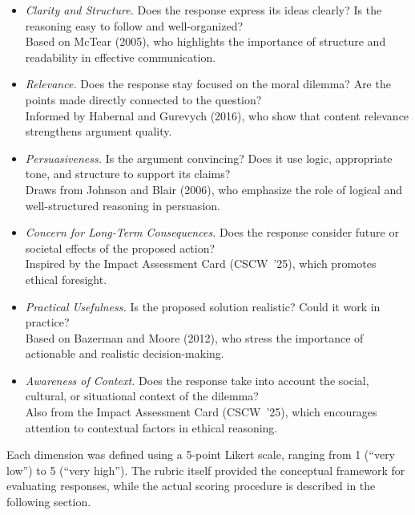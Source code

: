\documentclass[sigconf, authorversion, nonacm, screen]{acmart}
\begin{document}
\begin{itemize}
\item \textit{Clarity and Structure.} Does the response express its ideas clearly? Is the reasoning easy to follow and well-organized?\\
\hspace*{0.5em}Based on McTear (2005), who highlights the importance of structure and readability in effective communication.

\item \textit{Relevance.} Does the response stay focused on the moral dilemma? Are the points made directly connected to the question?\\
\hspace*{0.5em}Informed by Habernal and Gurevych (2016), who show that content relevance strengthens argument quality.

\item \textit{Persuasiveness.} Is the argument convincing? Does it use logic, appropriate tone, and structure to support its claims?\\
\hspace*{0.5em}Draws from Johnson and Blair (2006), who emphasize the role of logical and well-structured reasoning in persuasion.

\item \textit{Concern for Long-Term Consequences.} Does the response consider future or societal effects of the proposed action?\\
\hspace*{0.5em}Inspired by the Impact Assessment Card (CSCW~'25), which promotes ethical foresight.

\item \textit{Practical Usefulness.} Is the proposed solution realistic? Could it work in practice?\\
\hspace*{0.5em}Based on Bazerman and Moore (2012), who stress the importance of actionable and realistic decision-making.

\item \textit{Awareness of Context.} Does the response take into account the social, cultural, or situational context of the dilemma?\\
\hspace*{0.5em}Also from the Impact Assessment Card (CSCW~'25), which encourages attention to contextual factors in ethical reasoning.
\end{itemize}

Each dimension was defined using a 5-point Likert scale, ranging from 1 (``very low'') to 5 (``very high''). The rubric itself provided the conceptual framework for evaluating responses, while the actual scoring procedure is described in the following section.
\end{document}
